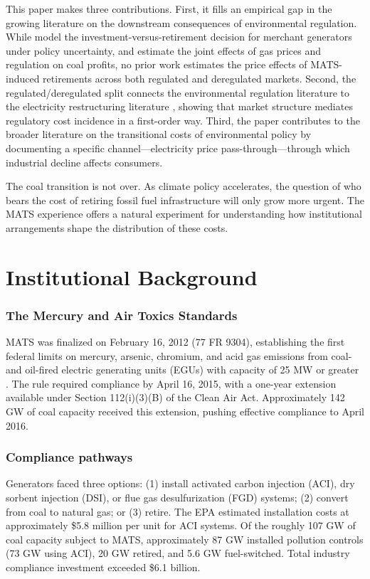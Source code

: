 \documentclass[12pt]{article}
\begin{document}
This paper makes three contributions. First, it fills an empirical gap in the growing literature on the downstream consequences of environmental regulation. While \citet{gowrisankaran2025mats} model the investment-versus-retirement decision for merchant generators under policy uncertainty, and \citet{linn2014energy} estimate the joint effects of gas prices and regulation on coal profits, no prior work estimates the price effects of MATS-induced retirements across both regulated and deregulated markets. Second, the regulated/deregulated split connects the environmental regulation literature to the electricity restructuring literature \citep{fabrizio2007public, borenstein2012private, borenstein2002trouble}, showing that market structure mediates regulatory cost incidence in a first-order way. Third, the paper contributes to the broader literature on the transitional costs of environmental policy \citep{walker2013transitional, curtis2018tall, greenstone2012environmental} by documenting a specific channel---electricity price pass-through---through which industrial decline affects consumers.

The coal transition is not over. As climate policy accelerates, the question of who bears the cost of retiring fossil fuel infrastructure will only grow more urgent. The MATS experience offers a natural experiment for understanding how institutional arrangements shape the distribution of these costs.

\section{Institutional Background}

\subsubsection*{The Mercury and Air Toxics Standards} MATS was finalized on February 16, 2012 (77 FR 9304), establishing the first federal limits on mercury, arsenic, chromium, and acid gas emissions from coal- and oil-fired electric generating units (EGUs) with capacity of 25 MW or greater \citep{epa2011ria}. The rule required compliance by April 16, 2015, with a one-year extension available under Section 112(i)(3)(B) of the Clean Air Act. Approximately 142 GW of coal capacity received this extension, pushing effective compliance to April 2016.

\subsubsection*{Compliance pathways} Generators faced three options: (1) install activated carbon injection (ACI), dry sorbent injection (DSI), or flue gas desulfurization (FGD) systems; (2) convert from coal to natural gas; or (3) retire. The EPA estimated installation costs at approximately \$5.8 million per unit for ACI systems. Of the roughly 107 GW of coal capacity subject to MATS, approximately 87 GW installed pollution controls (73 GW using ACI), 20 GW retired, and 5.6 GW fuel-switched. Total industry compliance investment exceeded \$6.1 billion.
\end{document}
